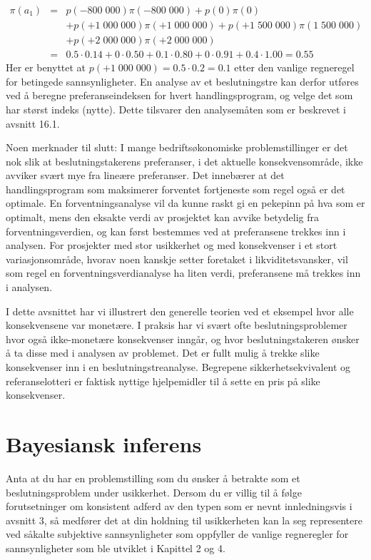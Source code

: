 {{\begin{eqnarray*}
\pi (a_1)&=&p(-800\;000)\pi (-800\;000)+p(0)\pi (0)\\
         & &+p(+1\;000\;000)\pi (+1\;000\;000)+p(+1\;500\;000)\pi (1\;500\;000)\\
         & &+p(+2\;000\;000)\pi (+2\;000\;000)\\
         &=&0.5\cdot 0.14+0\cdot 0.50+0.1\cdot 0.80+0\cdot 0.91+0.4\cdot 1.00
          =0.55
\end{eqnarray*}
Her er benyttet at $p(+1\;000\;000) = 0.5\cdot 0.2 = 0.1$ etter den vanlige
regne\-regel for betingede sannsynligheter.  En analyse av et 
beslutningstre kan derfor utføres ved å beregne preferanseindeksen
for hvert handlingsprogram, og velge det som har størst indeks (nytte).
Dette tilsvarer den analyse\-måten som er beskrevet i avsnitt 16.1.

Noen merknader til slutt: 
I mange bedriftsøkonomiske problemstillinger er det nok slik at 
beslutningstakerens preferanser, i det aktuelle konsekvensområde,
ikke avviker svært mye fra lineære prefe\-ranser.  Det innebærer
at det handlingsprogram som maksimerer forventet fortjeneste som regel
også er det optimale.  En forventningsanalyse vil da kunne raskt gi
en pekepinn på hva som er optimalt, mens den eksakte verdi av 
prosjektet kan avvike betydelig fra forventningsverdien, og kan først
bestemmes ved at preferansene trekkes inn i analysen.  For prosjekter
med stor usikkerhet og med konsekvenser i et stort variasjonsområde, 
hvorav noen kanskje setter foretaket i likviditetsvansker, vil som regel
en forventningsverdianalyse ha liten verdi, preferansene må trekkes
inn i analysen.

I dette avsnittet har vi illustrert den generelle teorien ved et eksempel
hvor alle konsekvensene var monetære.  I praksis har vi svært
ofte beslutningsproblemer hvor også ikke-monetære konsekvenser
inngår, og hvor beslutningstakeren ønsker å ta disse med i 
analysen av problemet.  Det er fullt mulig å trekke slike konsekvenser
inn i en beslutnings\-tre\-ana\-lyse.  Begrepene sikkerhetsekvivalent og
referanselotteri er faktisk nyttige hjelpemidler til å sette en pris
på slike konsekvenser.

\section{Bayesiansk inferens}

Anta at du har en problemstilling som du ønsker å betrakte som
et beslutningsproblem under usikkerhet.  Dersom du er villig til å
følge forutsetninger om konsistent adferd av den typen som er
nevnt innledningsvis i avsnitt 3, så medfører det at din 
holdning til usikkerheten kan la seg representere ved såkalte 
subjektive sannsynligheter som oppfyller de vanlige regneregler for
sannsynligheter som ble utviklet i Kapittel 2 og 4.

}}
